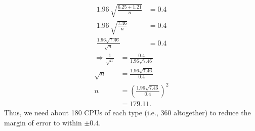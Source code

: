 \documentclass[12pt]{article}
\begin{document}
{\begin{minipage}[t]{0.98\textwidth}
\begin{minipage}[t]{0.47\textwidth}
\begin{enumerate}
\begin{align*}
1.96 \, \sqrt{\frac{6.25+1.21}{n}} &= 0.4\\[0.2cm]
1.96 \, \sqrt{\frac{7.46}{n}} &= 0.4\\[0.2cm]
\frac{1.96\sqrt{7.46}}{\sqrt{n}} &= 0.4
\end{align*}
\begin{align*}
\Rightarrow \frac{1}{\sqrt{n}} &= \frac{0.4}{1.96\sqrt{7.46}}\\[0.2cm]
\sqrt{n} &= \frac{1.96\sqrt{7.46}}{0.4}\\[0.2cm]
n &= \left(\frac{1.96\sqrt{7.46}}{0.4}\right)^2 \\[0.2cm]
&= 179.11.
\end{align*}
Thus, we need about 180 CPUs of each type (i.e., 360 altogether) to reduce the margin of error to within $\pm 0.4$.
\end{enumerate}
\end{minipage}
\end{minipage}}\vspace{0.03\textwidth}
\end{document}
